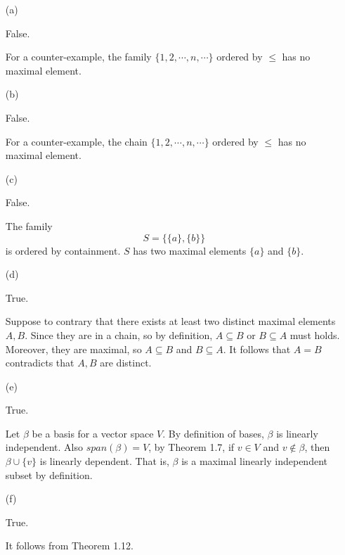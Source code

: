 \begin{Exercise}
\begin{enumerate}[(a)]
\item[(a)]
\begin{answer}
False.
\end{answer}
\begin{solution}
For a counter-example, the family $\{1,2,\cdots,n,\cdots\}$ ordered by $\leq$ has no maximal element.
\end{solution}

\item[(b)]
\begin{answer}
False.
\end{answer}
\begin{solution}
For a counter-example, the chain $\{1,2,\cdots,n,\cdots\}$ ordered by $\leq$ has no maximal element.
\end{solution}

\item[(c)]
\begin{answer}
False.
\end{answer}
\begin{solution}
The family
$$
S = \{ \{a\}, \{b\} \}
$$
is ordered by containment. $S$ has two maximal elements $\{a\}$ and $\{b\}$.
\end{solution}

\item[(d)]
\begin{answer}
True.
\end{answer}
\begin{solution}
Suppose to contrary that there exists at least two distinct maximal elements $A,B$. Since they are in a chain, so by definition, $A\subseteq B$ or $B\subseteq A$ must holds. Moreover, they are maximal, so $A\subseteq B$ and $B\subseteq A$. It follows that $A=B$ contradicts that $A,B$ are distinct.
\end{solution}

\item[(e)]
\begin{answer}
True.
\end{answer}
\begin{solution}
Let $\beta$ be a basis for a vector space $V$. By definition of bases, $\beta$ is linearly independent. Also $span(\beta)=V$, by Theorem 1.7, if $v\in V$ and $v\notin \beta$, then $\beta\cup\{v\}$ is linearly dependent. That is, $\beta$ is a maximal linearly independent subset by definition.
\end{solution}

\item[(f)]
\begin{answer}
True.
\end{answer}
\begin{solution}
It follows from Theorem 1.12.
\end{solution}

\end{enumerate}
\end{Exercise}